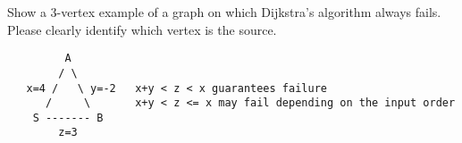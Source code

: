 \begin{cluster}
\label{grp:prb:examii-practice::show}

\begin{problem}[5]
\label{prb:examii-practice::show}
Show a $3$-vertex example of a graph on which Dijkstra's algorithm always
fails. Please clearly identify which vertex is the source.

\sol
\begin{verbatim}
         A 
        / \
   x=4 /   \ y=-2   x+y < z < x guarantees failure
      /     \       x+y < z <= x may fail depending on the input order
    S ------- B
        z=3
\end{verbatim}

\end{problem}
\end{cluster}

